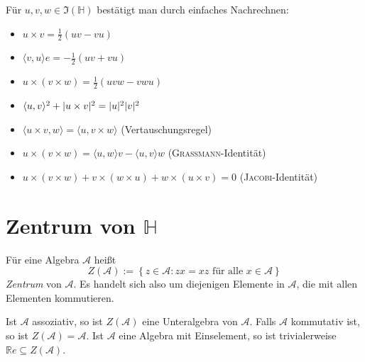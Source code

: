 \documentclass[aspectratio=169]{beamer}
\newcommand{\Ham}{\ensuremath{\mathbb{H}}{ }}
\newcommand{\R}{\ensuremath{\mathbb{R}}{ }}
\DeclarePairedDelimiter\abs{\lvert}{\rvert}
\begin{document}
    \begin{frame}
        Für \(u, v, w \in \Im(\Ham)\) bestätigt man durch einfaches Nachrechnen:
        \begin{itemize}
            \item
                \(u \times v = \frac{1}{2} (uv - vu)\)

            \item
                \(\langle v, u \rangle e = - \frac{1}{2} (uv + vu)\)

            \item
                \(u \times (v \times w) = \frac{1}{2} (uvw - vwu)\)

            \item
                \(\langle u, v \rangle^2 + \abs{u \times v}^2 = \abs{u}^2 \abs{v}^2\)

            \item
                \(\langle u \times v, w \rangle = \langle u, v \times w \rangle\) \hfill (Vertauschungsregel)

            \item
                \(u \times (v \times w) = \langle u, w \rangle v - \langle u, v \rangle w\) \hfill (\textsc{Grassmann}-Identität)

            \item
                \(u \times (v \times w) + v \times (w \times u) + w \times (u \times v) = 0\) \hfill (\textsc{Jacobi}-Identität)
        \end{itemize}
    \end{frame}

    \section{Zentrum von \(\mathbb{H}\)}
    \begin{frame}
        \begin{definition}
            Für eine Algebra \(\mathcal{A}\) heißt
            \[
                Z \left( \mathcal{A} \right) := \left\{ z \in \mathcal{A} \colon zx = xz \text{ für alle } x \in \mathcal{A} \right\}
            \] 
            \emph{Zentrum} von \(\mathcal{A}\).
            Es handelt sich also um diejenigen Elemente in \(\mathcal{A}\), die mit allen Elementen kommutieren.

            Ist \(\mathcal{A}\) assoziativ, so ist \(Z(\mathcal{A})\) eine Unteralgebra von \(\mathcal{A}\).
            Falls \(\mathcal{A}\) kommutativ ist, so ist \(Z(\mathcal{A}) = \mathcal{A}\).
            Ist \(\mathcal{A}\) eine Algebra mit Einselement, so ist trivialerweise \(\R e \subseteq Z(\mathcal{A})\).
        \end{definition}
    \end{frame}
\end{document}
